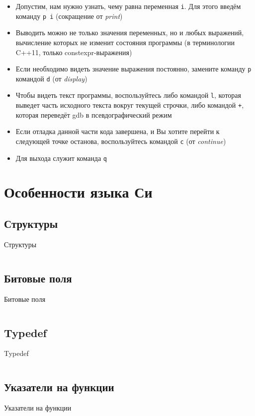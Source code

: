 \documentclass[handout]{beamer}
\begin{document}
\begin{frame}
	\begin{itemize}
		\item{Допустим, нам нужно узнать, чему равна переменная \texttt{i}. Для этого введём команду \texttt{p i} (сокращение от \emph{print})}\pause
		\item{Выводить можно не только значения переменных, но и любых выражений, вычисление которых не изменит состояния программы (в терминологии C++11, только constexpr-выражения)}\pause
		\item{Если необходимо видеть значение выражения постоянно, замените команду \texttt{p} командой \texttt{d} (от \emph{display})}\pause
		\item{Чтобы видеть текст программы, воспользуйтесь либо командой \texttt{l}, которая выведет часть исходного текста вокруг текущей строчки, либо командой \texttt{+}, которая переведёт gdb в псевдографический режим}\pause
		\item{Если отладка данной части кода завершена, и Вы хотите перейти к следующей точке останова, воспользуйтесь командой \texttt{c} (от \emph{continue})}\pause
		\item{Для выхода служит команда \texttt{q}}
	\end{itemize}
\end{frame}

\section{Особенности языка Си}

\subsection{Структуры}
\begin{frame}{Структуры}
	\inputminted[linenos,bgcolor=listing,fontsize=\small]{C}{files/c_programming_langauge/struct.c}
\end{frame}

\subsection{Битовые поля}
\begin{frame}{Битовые поля}
	\inputminted[linenos,bgcolor=listing,fontsize=\small]{C}{files/c_programming_langauge/bitfield.c}
\end{frame}
	
\subsection{Typedef}
\begin{frame}{Typedef}
	\inputminted[linenos,bgcolor=listing,fontsize=\small]{C}{files/c_programming_langauge/typedef.c}
\end{frame}

\subsection{Указатели на функции}
\begin{frame}{Указатели на функции}
	\inputminted[linenos,bgcolor=listing,fontsize=\small]{C}{files/c_programming_langauge/funcptr.c}
\end{frame}
	
\end{document}
